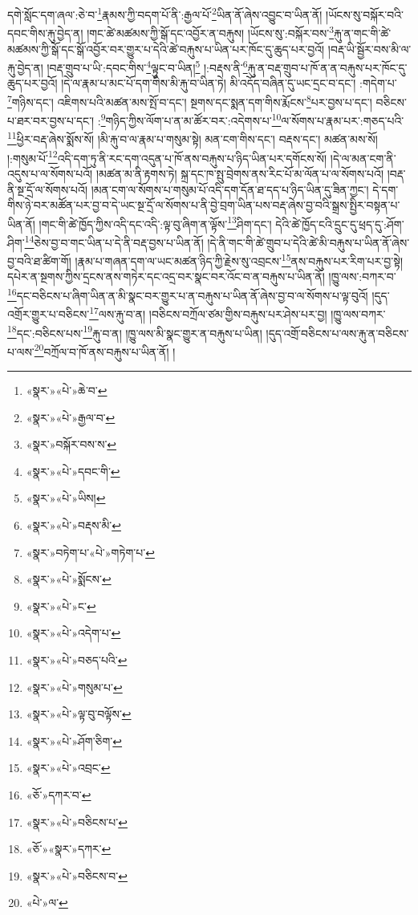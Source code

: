 དགེ་སློང་དག་ཞལ་:ཅེ་བ་\footnote{«སྣར་»«པེ་»ཆེ་བ་}རྣམས་ཀྱི་བདག་པོ་ནི་:རྒྱལ་པོ་\footnote{«སྣར་»«པེ་»རྒྱལ་བ་}ཡིན་ནོ་ཞེས་འབྱུང་བ་ཡིན་ནོ། །ཡོངས་སུ་བསྐོར་བའི་དབང་གིས་རྐུ་བྱེད་ན། །གང་ཚེ་མཚམས་ཀྱི་སྒོ་དང་འབྱོར་ན་བརྐུས། །ཡོངས་སུ་:བསྐོར་བས་\footnote{«སྣར་»བསྐོར་བས་ས་}རྐུ་ན་གང་གི་ཚེ་མཚམས་ཀྱི་སྒོ་དང་སྒོ་འབྱོར་བར་གྱུར་པ་དེའི་ཚེ་བརྐུས་པ་ཡིན་པར་ཁོང་དུ་ཆུད་པར་བྱའོ། །བརྡ་ཡི་སྦྱོར་བས་མི་ལ་རྐུ་བྱེད་ན། །བརྡ་གྲུབ་པ་ཡི་:དབང་གིས་\footnote{«སྣར་»«པེ་»དབང་གི་}ལྟུང་བ་ཡིན།\footnote{«སྣར་»«པེ་»ཡིས།} །:བརྡས་ནི་\footnote{«སྣར་»«པེ་»བརྡས་མི་}རྐུ་ན་བརྡ་གྲུབ་པ་ཁོ་ན་ན་བརྐུས་པར་ཁོང་དུ་ཆུད་པར་བྱའོ། །དེ་ལ་རྣམ་པ་མང་པོ་དག་གིས་མི་རྐུ་བ་ཡིན་ཏེ། མི་འདོད་བཞིན་དུ་ཡང་དྲང་བ་དང་། :གདེག་པ་\footnote{«སྣར་»བཏེག་པ་«པེ་»གཏེག་པ་}གཉིས་དང་། འཇིགས་པའི་མཚན་མས་སྤོ་བ་དང་། སྔགས་དང་སྨན་དག་གིས་རྨོངས་\footnote{«སྣར་»«པེ་»སྨོངས་}པར་བྱས་པ་དང་། བཅིངས་པ་ཐར་བར་བྱས་པ་དང་། :\footnote{«སྣར་»«པེ་»ང་}གཉིད་ཀྱིས་ལོག་པ་ན་མ་ཚོར་བར་:འདེགས་པ་\footnote{«སྣར་»«པེ་»འདེག་པ་}ལ་སོགས་པ་རྣམ་པར་:གཅད་པའི་\footnote{«སྣར་»«པེ་»བཅད་པའི་}ཕྱིར་བརྡ་ཞེས་སྨོས་སོ། །མི་རྐུ་བ་ལ་རྣམ་པ་གསུམ་སྟེ། མན་ངག་གིས་དང་། བརྡས་དང་། མཚན་མས་སོ། །:གསུམ་པོ་\footnote{«སྣར་»«པེ་»གསུམ་པ་}འདི་དག་ཏུ་ནི་རང་དག་འདུན་པ་ཁོ་ནས་བརྐུས་པ་ཉིད་ཡིན་པར་དགོངས་སོ། །དེ་ལ་མན་ངག་ནི་འདུས་པ་ལ་སོགས་པའོ། །མཚན་མ་ནི་རྟགས་ཏེ། སྐྲ་དང་ཁ་སྤུ་བྲེགས་ནས་རིང་པོ་མ་ལོན་པ་ལ་སོགས་པའོ། །བརྡ་ནི་སྔ་དྲོ་ལ་སོགས་པའོ། །མན་ངག་ལ་སོགས་པ་གསུམ་པོ་འདི་དག་དོན་ཐ་དད་པ་ཉིད་ཡིན་དུ་ཟིན་ཀྱང་། དེ་དག་གིས་ཉེ་བར་མཚོན་པར་བྱ་བ་དེ་ཡང་སྔ་དྲོ་ལ་སོགས་པ་ནི་བྱེ་བྲག་ཡིན་པས་བརྡ་ཞེས་བྱ་བའི་སྒྲས་སྤྱིར་བསྟན་པ་ཡིན་ནོ། །གང་གི་ཚེ་ཁྱོད་ཀྱིས་འདི་དང་འདི་:ལྟ་བུ་ཞིག་ན་ལྟོས་\footnote{«སྣར་»«པེ་»ལྟ་བུ་བལྟོས་}ཤིག་དང་། དེའི་ཚེ་ཁྱོད་ངའི་དྲུང་དུ་ཕྲད་དུ་:ཤོག་ཤིག་\footnote{«སྣར་»«པེ་»ཤོག་ཅིག་}ཅེས་བྱ་བ་གང་ཡིན་པ་དེ་ནི་བརྡ་བྱས་པ་ཡིན་ནོ། །དེ་ནི་གང་གི་ཚེ་གྲུབ་པ་དེའི་ཚེ་མི་བརྐུས་པ་ཡིན་ནོ་ཞེས་བྱ་བའི་ཐ་ཚིག་གོ། །རྣམ་པ་གཞན་དག་ལ་ཡང་མཚན་ཉིད་ཀྱི་རྗེས་སུ་འབྲངས་\footnote{«སྣར་»«པེ་»འབྲང་}ནས་བརྐུས་པར་རིག་པར་བྱ་སྟེ། དཔེར་ན་སྔགས་ཀྱིས་དྲངས་ནས་གཏེར་དང་འདྲ་བར་སྣང་བར་འོང་བ་ན་བརྐུས་པ་ཡིན་ནོ། །ཁྱུ་ལས་:བཀར་བ་\footnote{«ཅོ་»དཀར་བ་}དང་བཅིངས་པ་ཞིག་ཡིན་ན་མི་སྣང་བར་གྱུར་པ་ན་བརྐུས་པ་ཡིན་ནོ་ཞེས་བྱ་བ་ལ་སོགས་པ་ལྟ་བུའོ། །དུད་འགྲོར་གྱུར་པ་བཅིངས་\footnote{«སྣར་»«པེ་»བཅིངས་པ་}ལས་རྐུ་བ་ན། །བཅིངས་བཀྲོལ་ཙམ་གྱིས་བརྐུས་པར་ཤེས་པར་བྱ། །ཁྱུ་ལས་བཀར་\footnote{«ཅོ་»«སྣར་»དཀར་}དང་:བཅིངས་པས་\footnote{«སྣར་»«པེ་»བཅིངས་བ་}རྐུ་བ་ན། །ཁྱུ་ལས་མི་སྣང་གྱུར་ན་བརྐུས་པ་ཡིན། །དུད་འགྲོ་བཅིངས་པ་ལས་རྐུ་ན་བཅིངས་པ་ལས་\footnote{«པེ་»ལ་}བཀྲོལ་བ་ཁོ་ནས་བརྐུས་པ་ཡིན་ནོ། །
